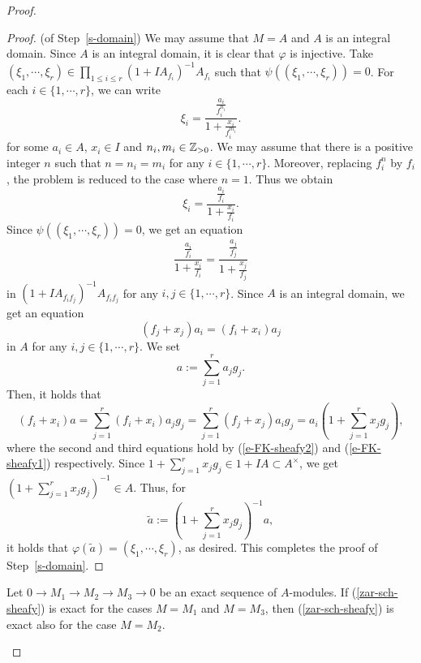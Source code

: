 \begin{proof}
\begin{proof}(of Step~\ref{s-domain}) 
We may assume that $M=A$ and $A$ is an integral domain. 
Since $A$ is an integral domain, it is clear that $\varphi$ is injective. 
Take $(\xi_1, \cdots, \xi_r) \in \prod_{1 \leq i\leq r}(1+IA_{f_i})^{-1}A_{f_i}$ 
such that $\psi((\xi_1, \cdots, \xi_r))=0$. 
For each $i \in \{1, \cdots, r\}$, we can write 
$$\xi_i=\frac{\frac{a_i}{f_i^{n_i}}}{1+\frac{x_i}{f_i^{m_i}}}.$$
for some $a_i\in A$, $x_i \in I$ and $n_i, m_i \in \mathbb{Z}_{> 0}$. 
We may assume that there is a positive integer $n$ such that $n=n_i=m_i$ 
for any $i \in \{1, \cdots, r\}$. 
Moreover, replacing $f_i^n$ by $f_i$, 
the problem is reduced to the case where $n=1$. 
Thus we obtain 
$$\xi_i=\frac{\frac{a_i}{f_i}}{1+\frac{x_i}{f_i}}.$$
Since $\psi((\xi_1, \cdots, \xi_r))=0$, we get an equation
$$\frac{\frac{a_i}{f_i}}{1+\frac{x_i}{f_i}}=\frac{\frac{a_j}{f_j}}{1+\frac{x_j}{f_j}}$$
in $(1+IA_{f_if_j})^{-1}A_{f_if_j}$ for any $i, j\in \{1, \cdots, r\}$. 
Since $A$ is an integral domain, we get an equation 
\begin{equation}\label{e-FK-sheafy2}
(f_j+x_j)a_i=(f_i+x_i)a_j
\end{equation}
in $A$ for any $i, j\in \{1, \cdots, r\}$. 
We set 
$$a:=\sum_{j=1}^ra_jg_j.$$
Then, it holds that 
$$(f_i+x_i)a=\sum_{j=1}^r(f_i+x_i)a_jg_j=\sum_{j=1}^r(f_j+x_j)a_ig_j
=a_i\left(1+\sum_{j=1}^rx_jg_j\right),$$
where the second and third equations hold by 
(\ref{e-FK-sheafy2}) and (\ref{e-FK-sheafy1}) respectively. 
Since $1+\sum_{j=1}^rx_jg_j \in 1+IA \subset A^{\times}$, 
we get $(1+\sum_{j=1}^rx_jg_j)^{-1} \in A$. 
Thus, for 
$$\widetilde a:=\left(1+\sum_{j=1}^r x_jg_j\right)^{-1}a,$$
it holds that $\varphi(\widetilde a)=(\xi_1, \cdots, \xi_r)$, as desired. 
This completes the proof of Step~\ref{s-domain}. 
\end{proof}

\begin{step}\label{s-thickening}
Let $0 \to M_1 \to M_2 \to M_3 \to 0$ be an exact sequence of $A$-modules. 
If 
(\ref{zar-sch-sheafy}) is exact for the cases $M =M_1$ and $M=M_3$, then 
(\ref{zar-sch-sheafy}) is exact also for the case $M=M_2$. 
\end{step}



\end{proof}
